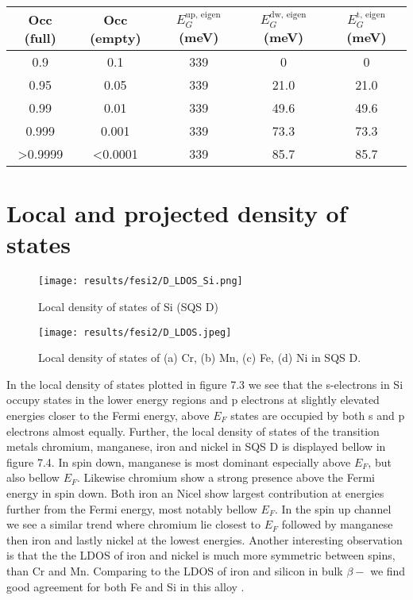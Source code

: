 \begin{table}[H]
\centering
\begin{tabular}{@{}ccccc@{}}
\toprule
Occ (full)          & Occ (empty)      & $E_G ^\text{up, eigen}$ (meV)  & $E_G ^\text{dw, eigen}$ (meV) & $E_G ^\text{t, eigen}$ (meV) \\ \midrule
0.9                 & 0.1              & 339 & 0    & 0     \\
0.95                & 0.05             & 339 & 21.0 & 21.0  \\
0.99                & 0.01             & 339 & 49.6 & 49.6  \\
0.999               & 0.001            & 339 & 73.3 & 73.3  \\
\textgreater 0.9999 & \textless 0.0001 & 339 & 85.7 & 85.7  \\ \bottomrule
\end{tabular}
\end{table}


\newpage
\section{Local and projected density of states}
  
\begin{figure}[H]
	\centering
	\texttt{[image: results/fesi2/D\_LDOS\_Si.png]}
	\caption{Local density of states of Si (SQS D)}
\end{figure} 

\begin{figure}[H]
	\centering
	\texttt{[image: results/fesi2/D\_LDOS.jpeg]}
	\caption{Local density of states of (a) Cr, (b) Mn, (c) Fe, (d) Ni in SQS D.}
\end{figure}   
  
In the local density of states plotted in figure 7.3 we see that the s-electrons in Si occupy states in the lower energy regions and p electrons at slightly elevated energies closer to the Fermi energy, above $E_F$ states are occupied by both s and p electrons almost equally. Further, the local density of states of the transition metals chromium, manganese, iron and nickel in SQS D is displayed bellow in figure 7.4. In spin down, manganese is most dominant especially above $E_F$, but also bellow $E_F$. Likewise chromium show a strong presence above the Fermi energy in spin down. Both iron an Nicel show largest contribution at energies further from the Fermi energy, most notably bellow $E_F$. In the spin up channel we see a similar trend where chromium lie closest to $E_F$ followed by manganese then iron and lastly nickel at the lowest energies. Another interesting observation is that the the LDOS of iron and nickel is much more symmetric between spins, than Cr and Mn. Comparing to the LDOS of iron and silicon in bulk $\beta-$  \cite{doi:10.1063/1.346415} we find good agreement for both Fe and Si in this alloy .

